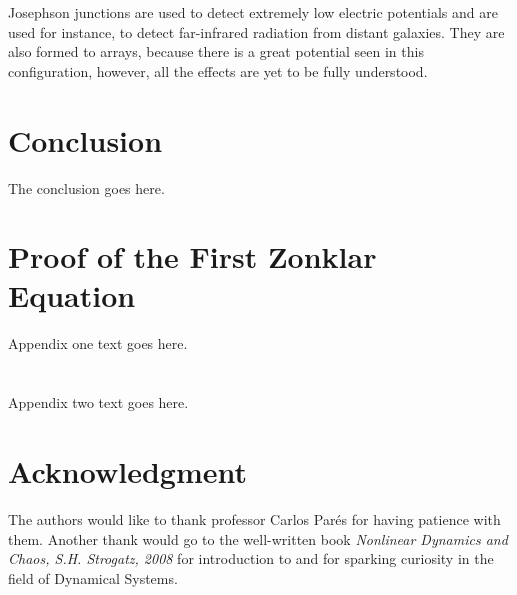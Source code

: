 \documentclass[journal]{IEEEtran}
\begin{document}
Josephson junctions are used to detect extremely low electric potentials and are used for instance, to detect far-infrared radiation from distant galaxies. They are also formed to arrays, because there is a great potential seen in this configuration, however, all the effects are yet to be fully understood.

\section{Conclusion}
The conclusion goes here.



%


\appendices
\section{Proof of the First Zonklar Equation}
Appendix one text goes here. 

\section{}
Appendix two text goes here.


\section*{Acknowledgment}
The authors would like to thank professor Carlos Par\'{e}s for having patience with them. Another thank would go to the well-written book \emph{Nonlinear Dynamics and Chaos, S.H. Strogatz, 2008} for introduction to and for sparking curiosity in the field of Dynamical Systems.

  \newpage

\printbibliography



\end{document}
